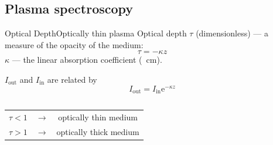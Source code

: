 \documentclass[dvipsnames]{beamer}
\begin{document}
\subsection{Plasma spectroscopy}
\begin{frame}{Optical Depth}{Optically thin plasma}
  Optical depth $\tau$ \small{(dimensionless)} --- a measure of the opacity of the medium:
  \begin{equation*}
    \tau=-\kappa z
  \end{equation*}
  $\kappa$ --- the linear absorption coefficient (\si{\per\cm}).

  $I_\text{out}$ and $I_\text{in}$ are related by
  \begin{equation*}
    I_\text{out} = I_\text{in}\mathrm{e}^{-\kappa z} %
  \end{equation*}
\begin{columns}
      
  \begin{center}
  \begin{tabular}{ c c c }
    $\tau<1$ & $\longrightarrow$ & optically thin medium\\ 
    $\tau>1$ & $\longrightarrow$ & optically thick medium
  \end{tabular}
  \end{center}
\end{columns}
\end{frame}
\end{document}
